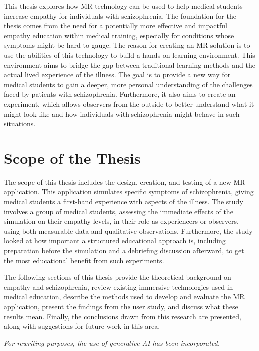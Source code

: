 \vspace{1em}

This thesis explores how MR technology can be used to help medical students increase empathy for individuals with schizophrenia. The foundation for the thesis comes from the need for a potentially more effective and impactful empathy education within medical training, especially for conditions whose symptoms might be hard to gauge. The reason for creating an MR solution is to use the abilities of this technology to build a hands-on learning environment. This environment aims to bridge the gap between traditional learning methods and the actual lived experience of the illness. The goal is to provide a new way for medical students to gain a deeper, more personal understanding of the challenges faced by patients with schizophrenia. Furthermore, it also aims to create an experiment, which allows observers from the outside to better understand what it might look like and how individuals with schizophrenia might behave in such situations.

\section{Scope of the Thesis}

The scope of this thesis includes the design, creation, and testing of a new MR application. This application simulates specific symptoms of schizophrenia, giving medical students a first-hand experience with aspects of the illness. The study involves a group of medical students, assessing the immediate effects of the simulation on their empathy levels, in their role as experiencers or observers, using both measurable data and qualitative observations. Furthermore, the study looked at how important a structured educational approach is, including preparation before the simulation and a debriefing discussion afterward, to get the most educational benefit from such experiments. 

\vspace{1em}

The following sections of this thesis provide the theoretical background on empathy and schizophrenia, review existing immersive technologies used in medical education, describe the methods used to develop and evaluate the MR application, present the findings from the user study, and discuss what these results mean. Finally, the conclusions drawn from this research are presented, along with suggestions for future work in this area.

\bigskip
\noindent
\textit{For rewriting purposes, the use of generative AI has been incorporated.}